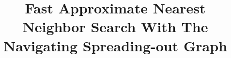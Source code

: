 \documentclass{vldb}
\begin{document}

\title{Fast Approximate Nearest Neighbor Search With The Navigating Spreading-out Graph}



%
%
%
%

\end{document}
